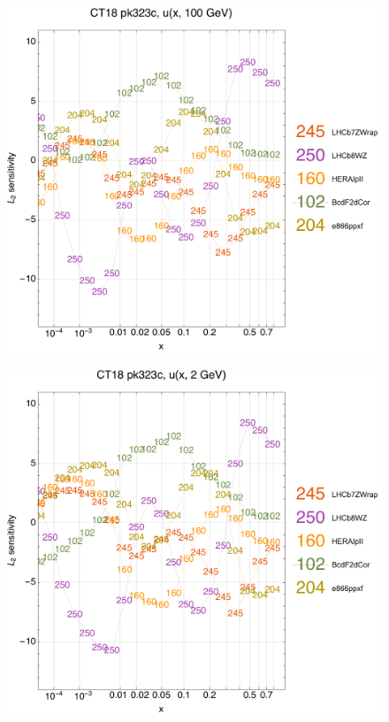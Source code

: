 \documentclass[10pt,aps,prd,floatfix,titlepage]{revtex4}
\begin{document}
\clearpage
\begin{figure}
\includegraphics[width=\textwidth,height=0.44\textheight,keepaspectratio]{1/ifl1_ct18nn_L2_q100_Sf_1.pdf}
\caption{}
\end{figure}
\begin{figure}
\includegraphics[width=\textwidth,height=0.44\textheight,keepaspectratio]{1/ifl1_ct18nn_L2_q2_Sf_1.pdf}
\caption{}
\end{figure}
\end{document}
